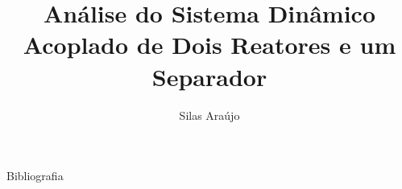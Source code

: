 \documentclass[aspectratio=169]{beamer}
\title{Análise do Sistema Dinâmico Acoplado de Dois Reatores e um Separador}
\author[Silas A.]{Silas Araújo}
\institute{Escola Politécnica da Universidade Federal da Bahia}
\begin{document}
\maketitle





\begin{frame}{Bibliografia}
  
\end{frame}
\end{document}

